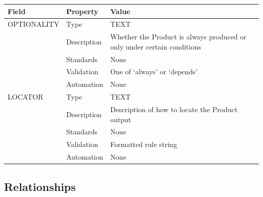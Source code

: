 \begin{longtable}[]{@{}
  >{\raggedright\arraybackslash}p{}
  >{\raggedright\arraybackslash}p{}
  >{\raggedright\arraybackslash}p{}@{}}
\toprule\noalign{}
\begin{minipage}[b]{\linewidth}\raggedright
Field
\end{minipage} & \begin{minipage}[b]{\linewidth}\raggedright
Property
\end{minipage} & \begin{minipage}[b]{\linewidth}\raggedright
Value
\end{minipage} \\
\midrule\noalign{}
\endhead
\bottomrule\noalign{}
\endlastfoot
OPTIONALITY & Type & TEXT \\
& Description & Whether the Product is always produced or only under
certain conditions \\
& Standards & None \\
& Validation & One of `always' or `depends' \\
& Automation & None \\
LOCATOR & Type & TEXT \\
& Description & Description of how to locate the Product output \\
& Standards & None \\
& Validation & Formatted rule string \\
& Automation & None \\
\end{longtable}

\subsection{Relationships}\label{relationships-21}

